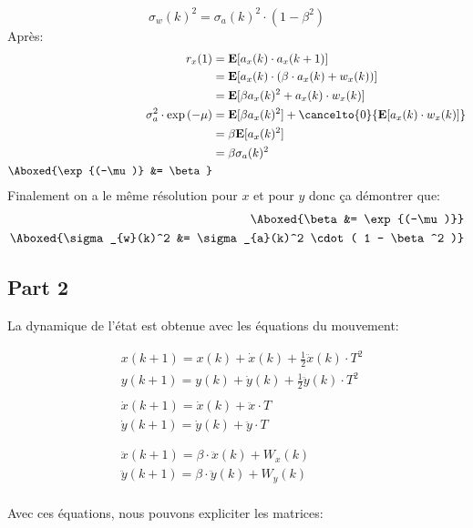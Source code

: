 \documentclass{article}
\begin{document}
\begin{equation*}
    \boxed{\sigma_{w}(k)^2 = \sigma_{a}(k)^2 \cdot ( 1 - \beta^2 )}
\end{equation*}
Après:
\begin{align*}
    r_{x}(1) &= \mathbf{E}[a_{x}(k) \cdot a_{x}(k+1)]\\
    &= \mathbf{E}[a_{x}(k) \cdot (\beta \cdot a_{x}(k) + w_{x}(k))]\\
    &= \mathbf{E}[\beta a_{x}(k)^{2} + a_{x}(k) \cdot w_{x}(k)]\\
    \sigma_{a}^{2} \cdot \exp{(-\mu)} &= \mathbf{E}[\beta a_{x}(k)^{2}] + \cancelto{0}{\mathbf{E}[a_{x}(k) \cdot w_{x}(k)]}\\
    &= \beta\mathbf{E}[a_{x}(k)^{2}]\\
    &= \beta\sigma_{a}(k)^2\\
    \Aboxed{\exp{(-\mu)} &= \beta}
\end{align*}
Finalement on a le même résolution pour $x$ et pour $y$ donc ça démontrer que:
\begin{align}
    \Aboxed{\beta &= \exp{(-\mu)}}\\
    \Aboxed{\sigma_{w}(k)^2 &= \sigma_{a}(k)^2 \cdot ( 1 - \beta^2 )}
\end{align}

\subsection{Part 2}
La dynamique de l'état est obtenue avec les équations du mouvement:

\begin{align*}
    &x(k+1) = x(k) + \dot{x}(k) + \frac{1}{2} \ddot{x}(k)\cdot T^2 \\
    &y(k+1) = y(k) + \dot{y}(k) + \frac{1}{2}  \ddot{y}(k)\cdot T^2\\
    \\
    &\dot{x}(k+1) = \dot{x}(k) + \ddot{x}\cdot T\\
    &\dot{y}(k+1) = \dot{y}(k) + \ddot{y}\cdot T\\
    \\
    \\
    &\ddot{x}(k+1) = \beta \cdot \ddot{x}(k) + W_x(k)\\
    &\ddot{y}(k+1) = \beta \cdot \ddot{y}(k) + W_y(k)\\
\end{align*}

Avec ces équations, nous pouvons expliciter les matrices:
\end{document}
